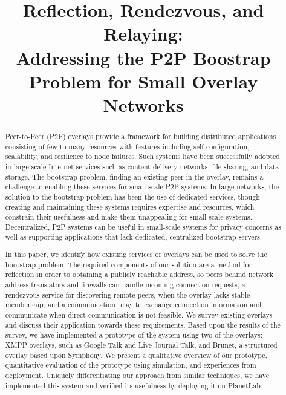 \documentclass[conference]{IEEEtran}
\begin{document}
\title{Reflection, Rendezvous, and Relaying: \\
Addressing the P2P Boostrap Problem for Small Overlay Networks}

\author{
}

\maketitle

\begin{abstract}

Peer-to-Peer (P2P) overlays provide a framework for building distributed
applications consisting of few to many resources with features including
self-configuration, scalability, and resilience to node failures.  Such systems
have been successfully adopted in large-scale Internet services such as content
delivery networks, file sharing, and data storage.  The bootstrap problem,
finding an existing peer in the overlay, remains a challenge to enabling these
services for small-scale P2P systems.  In large networks, the solution to the
bootstrap problem has been the use of dedicated services, though creating and
maintaining these systems requires expertise and resources, which constrain
their usefulness and make them unappealing for small-scale systems.
Decentralized, P2P systems can be useful in small-scale systems for privacy
concerns as well as supporting applications that lack dedicated, centralized
bootstrap servers.

In this paper, we identify how existing services or overlays can be used to
solve the bootstrap problem.  The required components of our solution are a
method for reflection in order to obtaining a publicly reachable address, so
peers behind network address translators and firewalls can handle incoming
connection requests; a rendezvous service for discovering remote peers, when
the overlay lacks stable membership; and a communication relay to exchange
connection information and communicate when direct communication is not
feasible.  We survey existing overlays and discuss their application towards
these requirements.  Based upon the results of the survey, we have implemented
a prototype of the system using two of the overlays:  XMPP overlays, such as
Google Talk and Live Journal Talk, and Brunet, a structured overlay based upon
Symphony.  We present a qualitative overview of our prototype, quantitative
evaluation of the prototype using simulation, and experiences from deployment.
Uniquely differentiating our approach from similar techniques, we have
implemented this system and verified its usefulness by deploying it on
PlanetLab.

\end{abstract}
\end{document}

